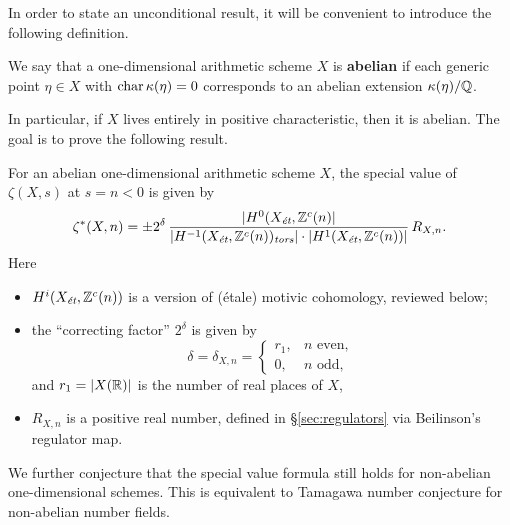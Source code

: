 \documentclass{article}
\numberwithin{equation}{section}
\begin{document}
\vspace{1em}

In order to state an unconditional result, it will be convenient to introduce
the following definition.

\begin{definition}
  We say that a one-dimensional arithmetic scheme $X$ is \textbf{abelian} if
  each generic point $\eta \in X$ with $\fchar \kappa (\eta) = 0$ corresponds to
  an abelian extension $\kappa (\eta)/\QQ$.
\end{definition}

In particular, if $X$ lives entirely in positive characteristic, then it is
abelian. The goal is to prove the following result.

\begin{theorem}
  \label{main-theorem}
  For an abelian one-dimensional arithmetic scheme $X$, the special value of
  $\zeta (X,s)$ at $s = n < 0$ is given by
  \begin{equation}
    \label{eqn:special-value-formula}
    \zeta^* (X,n) =
    \pm 2^\delta\,\frac{|H^0 (X_\et, \ZZ^c (n)|}{|H^{-1} (X_\et, \ZZ^c (n))_\tors| \cdot |H^1 (X_\et, \ZZ^c (n))|}\,R_{X,n}.
  \end{equation}
  Here
  \begin{itemize}
  \item $H^i (X_\et, \ZZ^c (n))$ is a version of (étale) motivic cohomology,
    reviewed below;

  \item the ``correcting factor'' $2^\delta$ is given by
    \begin{equation}
      \label{eqn:delta}
      \delta = \delta_{X,n} =
      \begin{cases}
        r_1, & n \text{ even}, \\
        0, & n \text{ odd},
      \end{cases}
    \end{equation}
    and $r_1 = |X (\RR)|$ is the number of real places of $X$,

  \item $R_{X,n}$ is a positive real number, defined in \S\ref{sec:regulators}
    via Beilinson's regulator map.
  \end{itemize}
\end{theorem}

We further conjecture that the special value formula still holds for non-abelian
one-dimensional schemes. This is equivalent to Tamagawa number conjecture for
non-abelian number fields.
\end{document}

